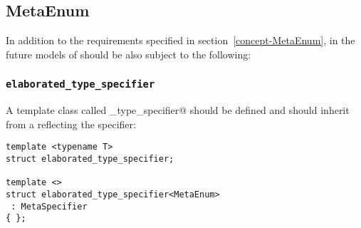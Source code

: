 \subsection{MetaEnum}

In addition to the requirements specified in section~\ref{concept-MetaEnum},
in the future models of  should be also subject to the following:

\subsubsection{\texttt{elaborated\_type\_specifier}}

A template class called \verb@elaborated_type_specifier@ should be defined and should inherit from
a  reflecting the \verb@enum@ specifier:

\begin{verbatim}
template <typename T>
struct elaborated_type_specifier;

template <>
struct elaborated_type_specifier<MetaEnum>
 : MetaSpecifier
{ };
\end{verbatim}

